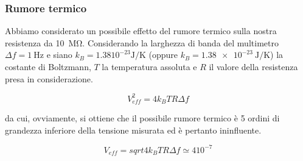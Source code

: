 \subsubsection*{Rumore termico}

Abbiamo considerato un possibile effetto del rumore termico sulla nostra resistenza da \SI{10}{\mega\ohm}. Considerando la larghezza di banda del multimetro $\Delta f = \SI{1}{\hertz}$ e siano $k_B = 1.38 10^{-23} \si{\joule\per\kelvin}$ (oppure $k_B = \SI{1.38e-23}{\joule\per\kelvin}$) la costante di Boltzmann, $T$ la temperatura assoluta e $R$ il valore della resistenza presa in considerazione.

\begin{equation}
	V_{eff}^2 = 4 k_B T R \Delta f
\end{equation}

da cui, ovviamente, si ottiene che il possibile rumore termico è 5 ordini di grandezza inferiore della tensione misurata ed è pertanto ininfluente.

\begin{equation}
	V_{eff} = sqrt{4 k_B T R \Delta f} \simeq 4 10^{-7}
\end{equation}